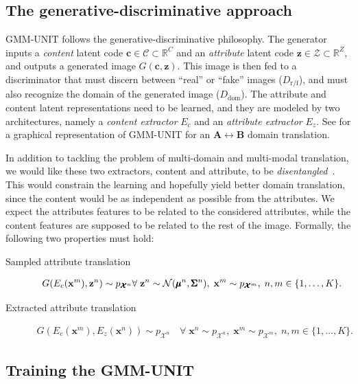 \documentclass[runningheads]{llncs}
\begin{document}
\subsection{The generative-discriminative approach}
GMM-UNIT follows the generative-discriminative philosophy. The generator inputs a \textit{content} latent code $\mathbf{c}\in\pmb{\mathcal{C}}\subset\mathbb{R}^C$ and an \textit{attribute} latent code $\mathbf{z}\in\pmb{\mathcal{Z}}\subset\mathbb{R}^Z$, and outputs a generated image $G(\mathbf{c},\mathbf{z})$. This image is then fed to a discriminator that must discern between ``real'' or ``fake'' images ($D_{\textrm{r/f}}$), and must also recognize the domain of the generated image ($D_{\textrm{dom}}$). 
The attribute and content latent representations need to be learned, and they are modeled by two architectures, namely a \textit{content extractor} $E_c$ and an \textit{attribute extractor} $E_z$. See  for a graphical representation of GMM-UNIT for an $\pmb{A}\leftrightarrow\pmb{B}$ domain translation.

In addition to tackling the problem of multi-domain and multi-modal translation, we would like these two extractors, content and attribute, to be \textit{disentangled}~\cite{huang2018multimodal}. 
This would constrain the learning and hopefully yield better domain translation, since the content would be as independent as possible from the attributes. 
We expect the attributes features to be related to the considered attributes, while the content features are supposed to be related to the rest of the image. Formally, the following two properties must hold:
\begin{description}
\item[Sampled attribute translation] \begin{multline*}
G(E_c(\mathbf{x}^m),\mathbf{z}^n)\sim p_{\pmb{\mathcal{X}}^n} \forall\; \mathbf{z}^n\sim {\cal N}(\pmb{\mu}^n, \pmb{\Sigma}^n),\; \mathbf{x}^m\sim p_{\pmb{\mathcal{X}}^m} ,\; n,m\in\{1,\ldots,K\}.\end{multline*}
\item[Extracted attribute translation] \begin{multline*} G(E_c(\mathbf{x}^m),E_z(\mathbf{x}^n))\sim p_{\pmb{\mathcal{X}}^n}\quad \forall \; \mathbf{x}^n\sim p_{\pmb{\mathcal{X}}^n},\; \mathbf{x}^m\sim p_{\pmb{\mathcal{X}}^m},\;n,m\in\{1,\ldots,K\}.\end{multline*}
\end{description}


\subsection{Training the GMM-UNIT}
\end{document}
